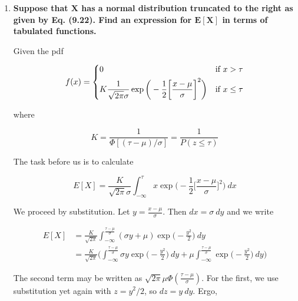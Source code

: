\documentclass[10pt, oneside]{article}   	%
\theoremstyle{definition}
\newtheorem*{thm}{Theorem}
\begin{document}
\begin{enumerate}[label=9.\arabic*]
\begin{thm}
where all the partial derivatives are evaluated at $(\mu_x, \mu_y)$.

\end{thm}

Given $Y = \ln X$, we need only calculate $\partial Y / \partial x = 1/x$ and $\partial^2 Y / \partial x^2 = -1/x^2$. Then $\boxed{ E[Y] \approx \ln \mu - \frac{\sigma^2}{2\mu^2}, V[Y] \approx \sigma^2/\mu^2 }$.

\item  \begin{tcolorbox}[
  colback=Cerulean!5!white,
  colframe=Cerulean!75!black]
\textbf{Suppose that $\bm{X}$ has a normal distribution truncated to the right as given by Eq. (9.22). Find an expression for $\bm{E[X]}$ in terms of tabulated functions.}
\end{tcolorbox}

Given the pdf

\[
f(x) = \begin{dcases}
0 & \text{if } x > \tau \\
K \frac{1}{\sqrt{2\pi} \sigma} \exp \bigg( -\frac{1}{2} \bigg[ \frac{x-\mu}{\sigma} \bigg]^2 \bigg) & \text{if } x \leq \tau
\end{dcases} 
\]

where

\[ K = \frac{1}{\Phi[(\tau - \mu) / \sigma]} = \frac{1}{P(z \leq \tau)}  \]

The task before us is to calculate

\[ E[X] = \frac{K}{\sqrt{2\pi} \sigma} \int^\tau_{-\infty} x \exp \bigg( -\frac{1}{2} \bigg[ \frac{x-\mu}{\sigma} \bigg]^2 \bigg) \ dx \]

We proceed by substitution. Let $y = \frac{x-\mu}{\sigma}$. Then $dx = \sigma \ dy$ and we write

\begin{align*}
E[X] &= \frac{K}{\sqrt{2\pi}} \int^{\frac{\tau - \mu}{\sigma}}_{-\infty} (\sigma y + \mu) \exp \bigg( -\frac{y^2}{2} \bigg) \ dy \\
&= \frac{K}{\sqrt{2\pi}} \bigg( \int^{\frac{\tau - \mu}{\sigma}}_{-\infty} \sigma y  \exp \bigg( -\frac{y^2}{2} \bigg) \ dy + \mu \int^{\frac{\tau - \mu}{\sigma}}_{-\infty}  \exp \bigg( -\frac{y^2}{2} \bigg) \ dy \bigg)
\end{align*}

The second term may be written as $\sqrt{2\pi} \mu \Phi (\frac{\tau-\mu}{\sigma})$. For the first, we use substitution yet again with $z = y^2/2$, so $dz = y \ dy$. Ergo,


\end{enumerate}
\end{document}
